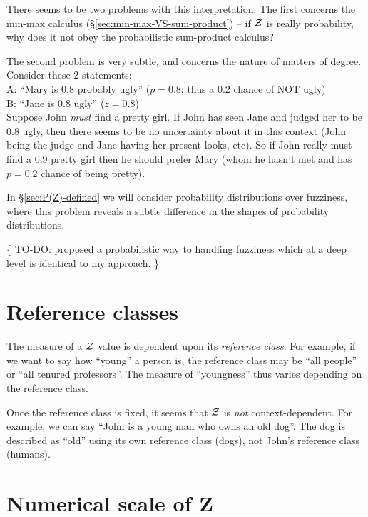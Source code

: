 There seems to be two problems with this interpretation.  The first concerns the min-max calculus (\S\ref{sec:min-max-VS-sum-product}) -- if $\mathcal{Z}$ is really probability, why does it not obey the probabilistic sum-product calculus?

The second problem is very subtle, and concerns the nature of matters of degree.  Consider these 2 statements:\\
\hspace*{1cm} A: ``Mary is 0.8 probably ugly''  ($p = 0.8$; thus a 0.2 chance of NOT ugly)\\
\hspace*{1cm} B: ``Jane is 0.8 ugly''  ($z = 0.8$)\\
Suppose John \emph{must} find a pretty girl.  If John has seen Jane and judged her to be 0.8 ugly, then there seems to be no uncertainty about it in this context (John being the judge and Jane having her present looks, etc).  So if John really must find a 0.9 pretty girl then he should prefer Mary (whom he hasn't met and has $p=0.2$ chance of being pretty).

In \S\ref{sec:P(Z)-defined} we will consider probability distributions over fuzziness, where this problem reveals a subtle difference in the shapes of probability distributions.

\{ TO-DO:  \citep*{Brachman2004} proposed a probabilistic way to handling fuzziness which at a deep level is identical to my approach.  \}

\section{Reference classes}

The measure of a $\mathcal{Z}$ value is dependent upon its \textit{reference class}.  For example, if we want to say how ``young'' a person is, the reference class may be ``all people'' or ``all tenured professors''.  The measure of ``youngness'' thus varies depending on the reference class.

Once the reference class is fixed, it seems that $\mathcal{Z}$ is \textit{not} context-dependent.  For example, we can say ``John is a young man who owns an old dog''.  The dog is described as ``old'' using its own reference class (dogs), not John's reference class (humans).

\section{Numerical scale of Z}
\label{sec:Z-numerical-scale}

